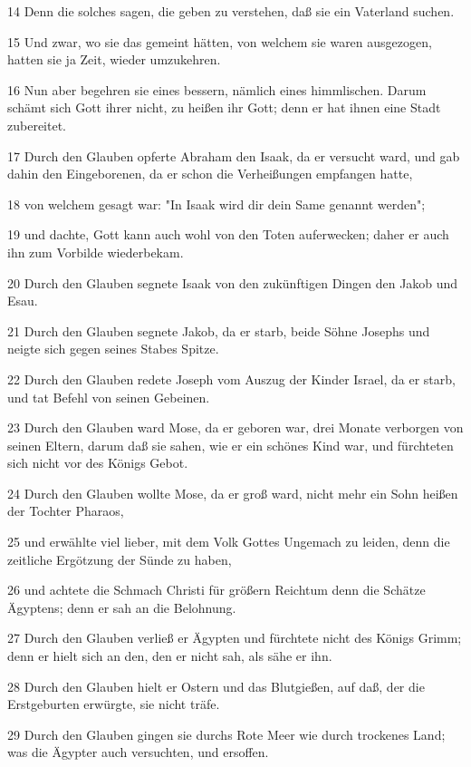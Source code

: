 \par 14 Denn die solches sagen, die geben zu verstehen, daß sie ein Vaterland suchen.
\par 15 Und zwar, wo sie das gemeint hätten, von welchem sie waren ausgezogen, hatten sie ja Zeit, wieder umzukehren.
\par 16 Nun aber begehren sie eines bessern, nämlich eines himmlischen. Darum schämt sich Gott ihrer nicht, zu heißen ihr Gott; denn er hat ihnen eine Stadt zubereitet.
\par 17 Durch den Glauben opferte Abraham den Isaak, da er versucht ward, und gab dahin den Eingeborenen, da er schon die Verheißungen empfangen hatte,
\par 18 von welchem gesagt war: "In Isaak wird dir dein Same genannt werden";
\par 19 und dachte, Gott kann auch wohl von den Toten auferwecken; daher er auch ihn zum Vorbilde wiederbekam.
\par 20 Durch den Glauben segnete Isaak von den zukünftigen Dingen den Jakob und Esau.
\par 21 Durch den Glauben segnete Jakob, da er starb, beide Söhne Josephs und neigte sich gegen seines Stabes Spitze.
\par 22 Durch den Glauben redete Joseph vom Auszug der Kinder Israel, da er starb, und tat Befehl von seinen Gebeinen.
\par 23 Durch den Glauben ward Mose, da er geboren war, drei Monate verborgen von seinen Eltern, darum daß sie sahen, wie er ein schönes Kind war, und fürchteten sich nicht vor des Königs Gebot.
\par 24 Durch den Glauben wollte Mose, da er groß ward, nicht mehr ein Sohn heißen der Tochter Pharaos,
\par 25 und erwählte viel lieber, mit dem Volk Gottes Ungemach zu leiden, denn die zeitliche Ergötzung der Sünde zu haben,
\par 26 und achtete die Schmach Christi für größern Reichtum denn die Schätze Ägyptens; denn er sah an die Belohnung.
\par 27 Durch den Glauben verließ er Ägypten und fürchtete nicht des Königs Grimm; denn er hielt sich an den, den er nicht sah, als sähe er ihn.
\par 28 Durch den Glauben hielt er Ostern und das Blutgießen, auf daß, der die Erstgeburten erwürgte, sie nicht träfe.
\par 29 Durch den Glauben gingen sie durchs Rote Meer wie durch trockenes Land; was die Ägypter auch versuchten, und ersoffen.
